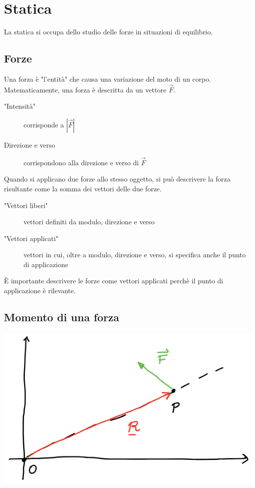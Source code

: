 \documentclass{subfiles}
\begin{document}
\section{Statica}

La statica si occupa dello studio delle forze in situazioni di equilibrio.

\subsection{Forze}

Una forza è "l'entità" che causa una variazione del moto di un corpo.
Matematicamente, una forza è descritta da un vettore $\vec{F}$.

\begin{description}
    \item["Intensità"] corrisponde a $|\vec{F}|$
    \item[Direzione e verso] corrispondono alla direzione e verso di $\vec{F}$
\end{description}

\noindent
Quando si applicano due forze allo stesso oggetto, si può descrivere la forza risultante come la somma dei vettori delle due forze.

\begin{description}
    \item["Vettori liberi"] vettori definiti da modulo, direzione e verso
    \item["Vettori applicati"] vettori in cui, oltre a modulo, direzione e verso, si specifica anche il punto di applicazione
\end{description}

\noindent
È importante descrivere le forze come vettori applicati perchè il punto di applicazione è rilevante.

\subsection{Momento di una forza}

\includegraphics[width=\columnwidth]{esempio-momento-della-forza}
\end{document}
